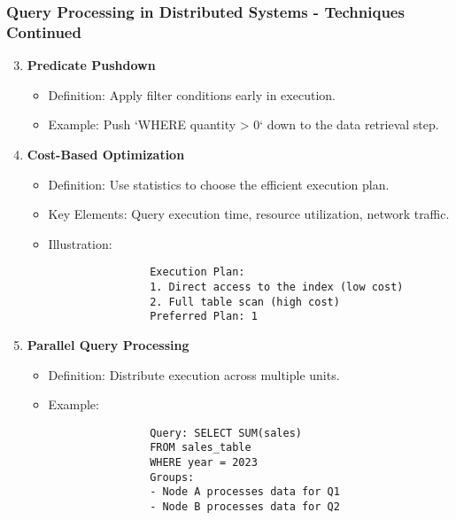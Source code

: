 \documentclass[aspectratio=169]{beamer}
\begin{document}
\begin{frame}[fragile]
    \frametitle{Query Processing in Distributed Systems - Techniques Continued}
    \begin{enumerate}
        \setcounter{enumi}{2}  %
        \item \textbf{Predicate Pushdown}
            \begin{itemize}
                \item Definition: Apply filter conditions early in execution.
                \item Example: Push `WHERE quantity > 0` down to the data retrieval step.
            \end{itemize}
        
        \item \textbf{Cost-Based Optimization}
            \begin{itemize}
                \item Definition: Use statistics to choose the efficient execution plan.
                \item Key Elements: Query execution time, resource utilization, network traffic.
                \item Illustration:
                \begin{lstlisting}
                Execution Plan:
                1. Direct access to the index (low cost)
                2. Full table scan (high cost)
                Preferred Plan: 1
                \end{lstlisting}
            \end{itemize}
        
        \item \textbf{Parallel Query Processing}
            \begin{itemize}
                \item Definition: Distribute execution across multiple units.
                \item Example:
                \begin{lstlisting}
                Query: SELECT SUM(sales) 
                FROM sales_table 
                WHERE year = 2023 
                Groups:
                - Node A processes data for Q1
                - Node B processes data for Q2
                \end{lstlisting}
            \end{itemize}
    \end{enumerate}
\end{frame}
\end{document}
